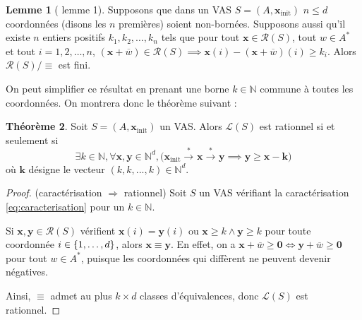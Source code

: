 \documentclass[a4paper,final]{article}
\theoremstyle{definition}
\newtheorem{Theorem}{Théorème}
\newtheorem{Lemma}[Theorem]{Lemme}
\let\leq\leqslant
\let\geq\geqslant
\newcommand{\os}[1]{\left\{\mathinner{#1}\right\}}
\newcommand{\N}{\ensuremath{\mathbb{N}}}
\newcommand{\lang}{\ensuremath{\mathcal{L}}}
\newcommand{\trans}[2]{\ensuremath{\stackrel{#1}{\longrightarrow}_{#2}}}
\newcommand{\vect}[1]{\ensuremath{\mathbf{#1}}}
\newcommand{\conf}[1]{\ensuremath{\mathcal{R}(#1)}}
\newcommand{\rel}{\ensuremath{\equiv}}
\newcommand{\equivaut}{\ensuremath{\Leftrightarrow}}
\newcommand{\xinit}{\ensuremath{\vect{x}_\text{init}}}
\newcommand{\valeur}[1]{\ensuremath{\overline{#1}}}
\begin{document}
\begin{Lemma}[\cite{giyo80} lemme 1]
    Supposons que dans un VAS $S=(A,\xinit)$ $n\leq d$ coordonnées (disons les $n$ premières) soient non-bornées.
    Supposons aussi qu'il existe $n$ entiers positifs $k_1,k_2,\dots,k_n$ tels que pour tout $\vect{x}\in\conf{S}$, tout $w\in A^\ast$ et tout $i=1,2,\dots,n$, 
    $(\vect{x} +\valeur{w})\in\conf{S} \implies \vect{x}(i) - (\vect{x} +\valeur{w})(i)\geq k_i$.
    Alors $\conf{S}/\rel$ est fini.
\end{Lemma}

On peut simplifier ce résultat en prenant une borne $k\in\N$ commune à toutes les coordonnées.
On montrera donc le théorème suivant :



\begin{Theorem}
    Soit $S=(A,\xinit)$ un VAS.
    Alors $\lang(S)$ est rationnel si et seulement si
    \begin{equation}
        \exists k\in\N, \forall \vect{x},\vect{y}\in\N^d, 
\big( \xinit\trans{*}{} \vect{x} \trans{*}{} \vect{y}\implies
\vect{y}\geq \vect{x} -\vect{k} \big)
    \label{eq:caracterisation}
    \end{equation}
    où $\vect{k}$ désigne le vecteur $(k,k,...,k)\in\N^d$.
\end{Theorem}

\begin{proof}(caractérisation $\Rightarrow$ rationnel)
Soit $S$ un VAS vérifiant la caractérisation \eqref{eq:caracterisation} pour un $k\in\N$.

Si $\vect{x},\vect{y}\in\conf{S}$ vérifient 
$\vect{x}(i)=\vect{y}(i)$ ou $\vect{x}\geq k \land \vect{y}\geq k$
pour toute coordonnée $i\in\os{1,\dots,d}$, alors $\vect{x}\rel\vect{y}$. 
En effet, on a $\vect{x} +\valeur{w} \geq\vect{0} \equivaut \vect{y} +\valeur{w} \geq\vect{0}$ pour tout $w\in A^\ast$, 
puisque les coordonnées qui diffèrent ne peuvent devenir négatives.

Ainsi, $\rel$ admet au plus $k\times d$ classes d'équivalences, donc $\lang(S)$ est rationnel.
\end{proof}
\end{document}
